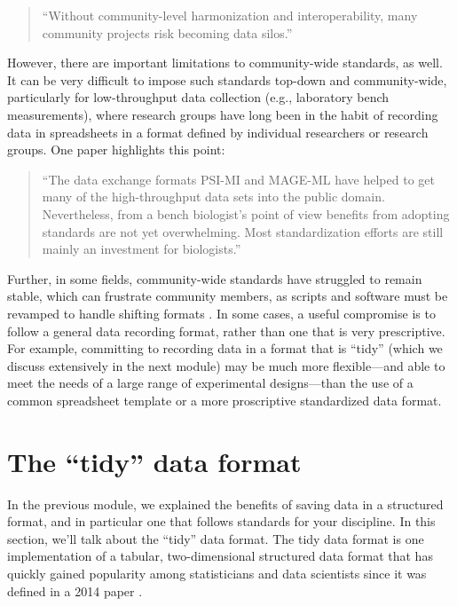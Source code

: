 \documentclass[]{tufte-book}
\begin{document}
\begin{quote}
``Without community-level harmonization and interoperability, many community
projects risk becoming data silos.'' \citep{sansone2012toward}
\end{quote}

However, there are important limitations to community-wide standards, as well.
It can be very difficult to impose such standards top-down and community-wide,
particularly for low-throughput data collection (e.g., laboratory bench
measurements), where research groups have long been in the habit of recording
data in spreadsheets in a format defined by individual researchers or research
groups. One paper highlights this point:

\begin{quote}
``The data exchange formats PSI-MI and MAGE-ML have helped to get many of the
high-throughput data sets into the public domain. Nevertheless, from a bench
biologist's point of view benefits from adopting standards are not yet
overwhelming. Most standardization efforts are still mainly an investment for
biologists.'' \citep{brazma2006standards}
\end{quote}

Further, in some fields, community-wide standards have struggled to remain
stable, which can frustrate community members, as scripts and software must be
revamped to handle shifting formats \citep{buffalo2015bioinformatics, barga2011bioinformatics}. In some cases, a useful compromise is to follow a
general data recording format, rather than one that is very prescriptive. For
example, committing to recording data in a format that is ``tidy'' (which we
discuss extensively in the next module) may be much more flexible---and able to
meet the needs of a large range of experimental designs---than the use of a
common spreadsheet template or a more proscriptive standardized data format.

\section{The ``tidy'' data format}\label{module3}

In the previous module, we explained the benefits of saving data in a structured
format, and in particular one that follows standards for your discipline. In
this section, we'll talk about the ``tidy'' data format. The tidy data format is
one implementation of a tabular, two-dimensional structured data format that has
quickly gained popularity among statisticians and data scientists since it was
defined in a 2014 paper \citep{wickham2014tidy}.
\end{document}
